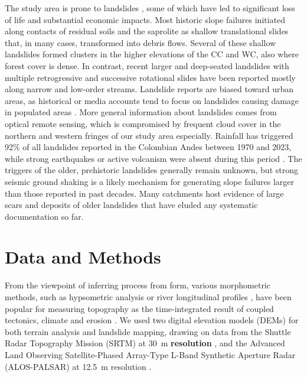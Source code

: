 \documentclass[draft]{agujournal2019}
\begin{document}
\par The study area is prone to landslides \cite{aristizabal2020, gomez2023spatial}, some of which have led to significant loss of life and substantial economic impacts. Most historic slope failures initiated along contacts of residual soils and the saprolite as shallow translational slides that, in many cases, transformed into debris flows. Several of these shallow landslides formed clusters in the higher elevations of the CC and WC, also where forest cover is dense. In contrast, recent larger and deep-seated landslides with multiple retrogressive and successive rotational slides have been reported mostly along narrow and low-order streams. Landslide reports are biased toward urban areas, as historical or media accounts tend to focus on landslides causing damage in populated areas \cite{guzzetti2012landslide, froude2018global}. More general information about landslides comes from optical remote sensing, which is compromised by frequent cloud cover in the northern and western fringes of our study area especially. Rainfall has triggered 92\% of all landslides reported in the Colombian Andes between 1970 and 2023, while strong earthquakes or active volcanism were absent during this period \cite{aristizabal2020}. The triggers of the older, prehistoric landslides generally remain unknown, but strong seismic ground shaking is a likely mechanism for generating slope failures larger than those reported in past decades. Many catchments host evidence of large scars and deposits of older landslides that have eluded any systematic documentation so far.


\section{Data and Methods}
\par From the viewpoint of inferring process from form, various morphometric methods, such as hypsometric analysis \cite{Strahler1952} or river longitudinal profiles \cite{Wobus2006}, have been popular for measuring topography as the time-integrated result of coupled tectonics, climate and erosion \cite{Whittaker2012, Perron2013, Willett2014}. We used two digital elevation models (DEMs) for both terrain analysis and landslide mapping, drawing on data from the Shuttle Radar Topography Mission (SRTM) at 30~m \textbf{resolution }\cite{farr2007}, and the Advanced Land Observing Satellite-Phased Array-Type L-Band Synthetic Aperture Radar (ALOS-PALSAR) at 12.5~m resolution \cite{logan2014}. 
\end{document}
